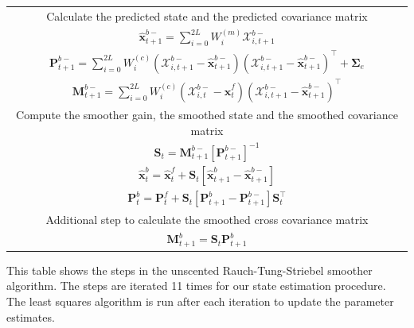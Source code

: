 \documentclass[]{article}
\begin{document}
\begin{table}[!ht]
\begin{tabular}{|c|}
\multicolumn{1}{|p{16cm}|}{Calculate the predicted state and the predicted covariance matrix}\\
$\hat{\mathbf x}_{t+1}^{b-}=\sum_{i=0}^{2L} W_i^{(m)}\mathcal X_{i,t+1}^{b-}$\\
$\mathbf P_{t +1}^{b-}=\sum_{i=0}^{2L} W_i^{(c)}(\mathcal X_{i,t+1}^{b-}-\hat{\mathbf x}_{t +1}^{b-})(\mathcal X_{i,t+1}^{b-}-\hat{\mathbf x}_{t +1}^{b-})^\top+\boldsymbol \Sigma_e $\\
$\mathbf M_{t +1}^{b-}=\sum_{i=0}^{2L} W_i^{(c)}(\mathcal X_{i,t}^{b-}-\hat{\mathbf x}_{t}^{f})(\mathcal X_{i,t+1}^{b-}-\hat{\mathbf x}_{t+1}^{b-})^\top$\\
\multicolumn{1}{|p{16cm}|}{Compute the smoother gain, the smoothed state and the smoothed covariance matrix}\\
$\mathbf S_t=\mathbf M_{t +1}^{b-}\left[ \mathbf P_{t +1}^{b-}\right] ^{-1} $\\
$\hat{\mathbf x}_t^b=\hat{\mathbf x}_t^f+\mathbf S_t\left[\hat{\mathbf x}_{t+1}^{b}-\hat{\mathbf x}_{t+1}^{b-}\right]$\\
$\mathbf P_{t}^{b}=\mathbf P_{t}^{f}+\mathbf S_t\left[\mathbf P_{t+1}^{b}-\mathbf P_{t+1}^{b-} \right]\mathbf S_t^\top $\\
\multicolumn{1}{|p{16cm}|}{Additional step to calculate the smoothed cross covariance matrix \cite{Sarkka2008}} \\
$\mathbf M_{t +1}^{b}=\mathbf S_t\mathbf P_{t+1}^{b}$\\
\hline
\end{tabular}
\begin{flushleft}This table shows the steps in the unscented Rauch-Tung-Striebel smoother algorithm. The steps are iterated 11 times for our state estimation procedure. The least squares algorithm is run after each iteration to update the parameter estimates.
\end{flushleft}
\label{tab:UKFAlgorithm}
\end{table}
 \renewcommand{\arraystretch}{1}
\newpage


\end{document}
